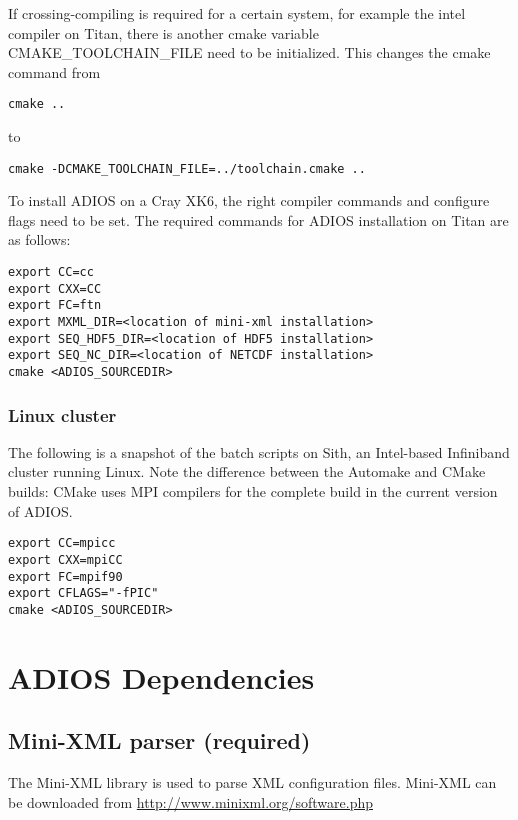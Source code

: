 If crossing-compiling is required for a certain system, for example the intel compiler on Titan, 
there is another cmake variable CMAKE\_TOOLCHAIN\_FILE need to be initialized. This changes the cmake
command from

\begin{lstlisting}
cmake ..
\end{lstlisting}
to
\begin{lstlisting}
cmake -DCMAKE_TOOLCHAIN_FILE=../toolchain.cmake ..
\end{lstlisting}

To install ADIOS on a Cray XK6, the right compiler commands and configure flags
need to be set. The required commands for ADIOS installation on Titan are as follows:

\begin{lstlisting}
export CC=cc
export CXX=CC
export FC=ftn
export MXML_DIR=<location of mini-xml installation>
export SEQ_HDF5_DIR=<location of HDF5 installation>
export SEQ_NC_DIR=<location of NETCDF installation>
cmake <ADIOS_SOURCEDIR>
\end{lstlisting}


\subsubsection{Linux cluster}

The following is a snapshot of the batch scripts on Sith, an Intel-based Infiniband 
cluster running Linux. Note the difference between the Automake and CMake builds: 
CMake uses MPI compilers for the complete build in the current version of ADIOS. 

\begin{lstlisting}
export CC=mpicc
export CXX=mpiCC
export FC=mpif90
export CFLAGS="-fPIC"
cmake <ADIOS_SOURCEDIR>
\end{lstlisting}


\section{ADIOS Dependencies}

\subsection{Mini-XML parser (required)}

The Mini-XML library is used to parse XML configuration files. Mini-XML can be 
downloaded from \url{http://www.minixml.org/software.php}



